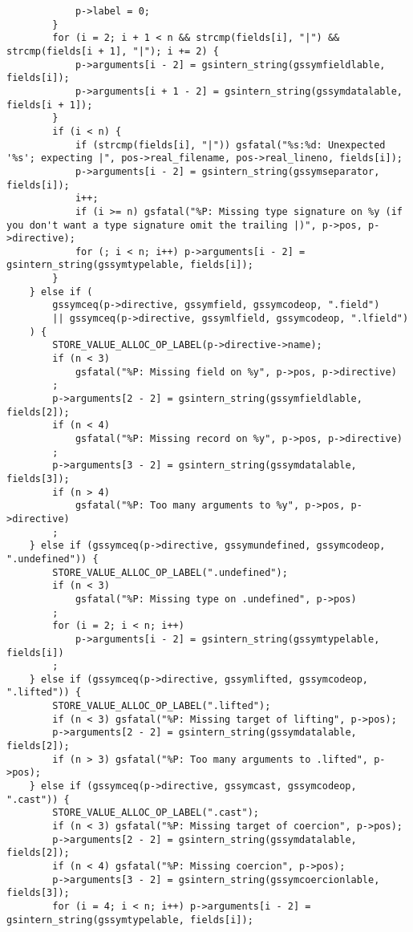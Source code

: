 \documentclass{report}
\begin{document}
\begin{verbatim}
            p->label = 0;
        }
        for (i = 2; i + 1 < n && strcmp(fields[i], "|") && strcmp(fields[i + 1], "|"); i += 2) {
            p->arguments[i - 2] = gsintern_string(gssymfieldlable, fields[i]);
            p->arguments[i + 1 - 2] = gsintern_string(gssymdatalable, fields[i + 1]);
        }
        if (i < n) {
            if (strcmp(fields[i], "|")) gsfatal("%s:%d: Unexpected '%s'; expecting |", pos->real_filename, pos->real_lineno, fields[i]);
            p->arguments[i - 2] = gsintern_string(gssymseparator, fields[i]);
            i++;
            if (i >= n) gsfatal("%P: Missing type signature on %y (if you don't want a type signature omit the trailing |)", p->pos, p->directive);
            for (; i < n; i++) p->arguments[i - 2] = gsintern_string(gssymtypelable, fields[i]);
        }
    } else if (
        gssymceq(p->directive, gssymfield, gssymcodeop, ".field")
        || gssymceq(p->directive, gssymlfield, gssymcodeop, ".lfield")
    ) {
        STORE_VALUE_ALLOC_OP_LABEL(p->directive->name);
        if (n < 3)
            gsfatal("%P: Missing field on %y", p->pos, p->directive)
        ;
        p->arguments[2 - 2] = gsintern_string(gssymfieldlable, fields[2]);
        if (n < 4)
            gsfatal("%P: Missing record on %y", p->pos, p->directive)
        ;
        p->arguments[3 - 2] = gsintern_string(gssymdatalable, fields[3]);
        if (n > 4)
            gsfatal("%P: Too many arguments to %y", p->pos, p->directive)
        ;
    } else if (gssymceq(p->directive, gssymundefined, gssymcodeop, ".undefined")) {
        STORE_VALUE_ALLOC_OP_LABEL(".undefined");
        if (n < 3)
            gsfatal("%P: Missing type on .undefined", p->pos)
        ;
        for (i = 2; i < n; i++)
            p->arguments[i - 2] = gsintern_string(gssymtypelable, fields[i])
        ;
    } else if (gssymceq(p->directive, gssymlifted, gssymcodeop, ".lifted")) {
        STORE_VALUE_ALLOC_OP_LABEL(".lifted");
        if (n < 3) gsfatal("%P: Missing target of lifting", p->pos);
        p->arguments[2 - 2] = gsintern_string(gssymdatalable, fields[2]);
        if (n > 3) gsfatal("%P: Too many arguments to .lifted", p->pos);
    } else if (gssymceq(p->directive, gssymcast, gssymcodeop, ".cast")) {
        STORE_VALUE_ALLOC_OP_LABEL(".cast");
        if (n < 3) gsfatal("%P: Missing target of coercion", p->pos);
        p->arguments[2 - 2] = gsintern_string(gssymdatalable, fields[2]);
        if (n < 4) gsfatal("%P: Missing coercion", p->pos);
        p->arguments[3 - 2] = gsintern_string(gssymcoercionlable, fields[3]);
        for (i = 4; i < n; i++) p->arguments[i - 2] = gsintern_string(gssymtypelable, fields[i]);

\end{verbatim}
\end{document}
